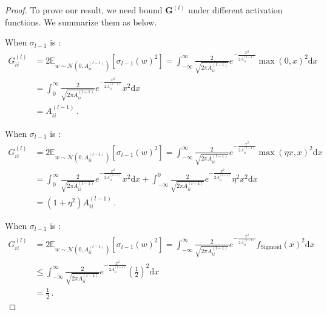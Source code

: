 \documentclass[nohyperref]{article}
\theoremstyle{plain}
\theoremstyle{definition}
\theoremstyle{remark}
\begin{document}
\begin{proof}
To prove our result, we need bound $\bm{G}^{(l)}$ under different activation functions.
We summarize them as below.

When $\sigma_{l-1}$ is :
\begin{equation}
\begin{split}
    G_{ii}^{(l)}&=2\mathbb{E}_{w \sim \mathcal N(0,A_{ii}^{(l-1)})}[\sigma_{l-1}(w)^2] =\int_{-\infty}^{\infty}\frac{2}{\sqrt{2\pi A_{ii}^{(l-1)}}}e^{-\frac{x^2}{2A_{ii}^{(l-1)}}}\max(0,x)^2 \mathrm{d}x\\
    &=\int_{0}^{\infty}\frac{2}{\sqrt{2\pi A_{ii}^{(l-1)}}}e^{-\frac{x^2}{2A_{ii}^{(l-1)}}}x^2 \mathrm{d}x \\
    &=A_{ii}^{(l-1)}\,.
    \end{split}
\label{eq:Gii_upper_bound_RelU}
\end{equation}

When $\sigma_{l-1}$ is :
\begin{equation}
\begin{split}
    G_{ii}^{(l)}&=2\mathbb{E}_{w \sim \mathcal N(0,A_{ii}^{(l-1)})}[\sigma_{l-1}(w)^2] =\int_{-\infty}^{\infty}\frac{2}{\sqrt{2\pi A_{ii}^{(l-1)}}}e^{-\frac{x^2}{2A_{ii}^{(l-1)}}}\max(\eta x,x)^2 \mathrm{d}x\\
    &=\int_{0}^{\infty}\frac{2}{\sqrt{2\pi A_{ii}^{(l-1)}}}e^{-\frac{x^2}{2A_{ii}^{(l-1)}}}x^2 \mathrm{d}x +\int_{-\infty}^{0}\frac{2}{\sqrt{2\pi A_{ii}^{(l-1)}}}e^{-\frac{x^2}{2A_{ii}^{(l-1)}}}\eta^2 x^2 \mathrm{d}x\\
    &=(1+\eta^2)A_{ii}^{(l-1)}\,.
\end{split}
\label{eq:Gii_upper_bound_LeakyReLU}
\end{equation}

When $\sigma_{l-1}$ is :
\begin{equation}
\begin{split}
    G_{ii}^{(l)}&=2\mathbb{E}_{w \sim \mathcal N(0,A_{ii}^{(l-1)})}[\sigma_{l-1}(w)^2]=\int_{-\infty}^{\infty}\frac{2}{\sqrt{2\pi A_{ii}^{(l-1)}}}e^{-\frac{x^2}{2A_{ii}^{(l-1)}}}f_{\mathrm{Sigmoid}}(x)^2 \mathrm{d}x\\
    & \leq \int_{-\infty}^{\infty}\frac{2}{\sqrt{2\pi A_{ii}^{(l-1)}}}e^{-\frac{x^2}{2A_{ii}^{(l-1)}}}(\frac{1}{2})^2 \mathrm{d}x\\
    & = \frac{1}{2}\,.
\end{split}
\label{eq:Gii_upper_bound_Sigmoid}
\end{equation}


\end{proof}
\end{document}
